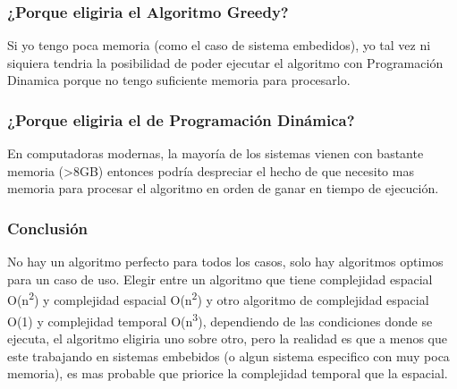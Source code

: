 \documentclass[titlepage,a4paper]{article}
\begin{document}
\subsubsection{¿Porque eligiria el Algoritmo Greedy?}
\label{sec:org46de3fe}
Si yo tengo poca memoria (como el caso de sistema embedidos), yo tal vez ni
siquiera tendria la posibilidad de poder ejecutar el algoritmo con Programación
Dinamica porque no tengo suficiente memoria para procesarlo.

\subsubsection{¿Porque eligiria el de Programación Dinámica?}
\label{sec:org03254b1}
En computadoras modernas, la mayoría de los sistemas vienen con bastante memoria
(>8GB) entonces podría despreciar el hecho de que necesito mas memoria para
procesar el algoritmo en orden de ganar en tiempo de ejecución.

\subsubsection{Conclusión}
\label{sec:orgb56c112}
No hay un algoritmo perfecto para todos los casos, solo hay algoritmos optimos
para un caso de uso. Elegir entre un algoritmo que tiene complejidad espacial
O(n\textsuperscript{2}) y complejidad espacial O(n\textsuperscript{2}) y otro algoritmo de complejidad espacial
O(1) y complejidad temporal O(n\textsuperscript{3}), dependiendo de las condiciones donde se
ejecuta, el algoritmo eligiria uno sobre otro, pero la realidad es que a menos
que este trabajando en sistemas embebidos (o algun sistema especifico con muy
poca memoria), es mas probable que priorice la complejidad temporal que la
espacial.
\end{document}
